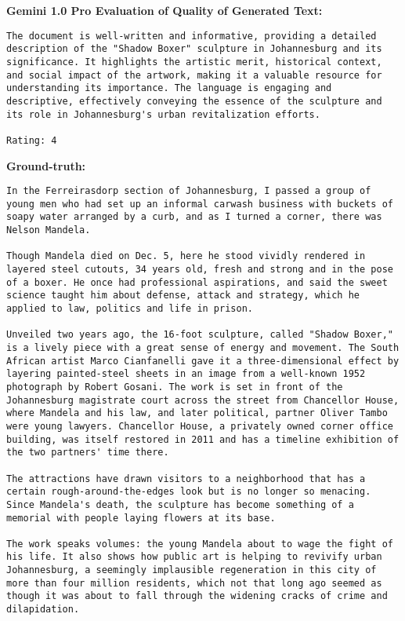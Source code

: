 {\bf\ttfamily Gemini 1.0 Pro Evaluation of Quality of Generated Text:}
\begin{lstlisting}
The document is well-written and informative, providing a detailed description of the "Shadow Boxer" sculpture in Johannesburg and its significance. It highlights the artistic merit, historical context, and social impact of the artwork, making it a valuable resource for understanding its importance. The language is engaging and descriptive, effectively conveying the essence of the sculpture and its role in Johannesburg's urban revitalization efforts.

Rating: 4
\end{lstlisting}


{\bf\ttfamily Ground-truth: }
\begin{lstlisting}
In the Ferreirasdorp section of Johannesburg, I passed a group of young men who had set up an informal carwash business with buckets of soapy water arranged by a curb, and as I turned a corner, there was Nelson Mandela.

Though Mandela died on Dec. 5, here he stood vividly rendered in layered steel cutouts, 34 years old, fresh and strong and in the pose of a boxer. He once had professional aspirations, and said the sweet science taught him about defense, attack and strategy, which he applied to law, politics and life in prison.

Unveiled two years ago, the 16-foot sculpture, called "Shadow Boxer," is a lively piece with a great sense of energy and movement. The South African artist Marco Cianfanelli gave it a three-dimensional effect by layering painted-steel sheets in an image from a well-known 1952 photograph by Robert Gosani. The work is set in front of the Johannesburg magistrate court across the street from Chancellor House, where Mandela and his law, and later political, partner Oliver Tambo were young lawyers. Chancellor House, a privately owned corner office building, was itself restored in 2011 and has a timeline exhibition of the two partners' time there.

The attractions have drawn visitors to a neighborhood that has a certain rough-around-the-edges look but is no longer so menacing. Since Mandela's death, the sculpture has become something of a memorial with people laying flowers at its base.

The work speaks volumes: the young Mandela about to wage the fight of his life. It also shows how public art is helping to revivify urban Johannesburg, a seemingly implausible regeneration in this city of more than four million residents, which not that long ago seemed as though it was about to fall through the widening cracks of crime and dilapidation.


\end{lstlisting}
